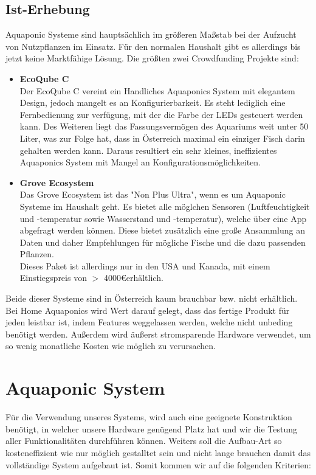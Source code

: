 \documentclass[11pt]{article}
\begin{document}
\subsection{Ist-Erhebung}
Aquaponic Systeme sind haupts\"achlich im gr\"o{\ss}eren Ma{\ss}stab bei der Aufzucht von Nutzpflanzen im Einsatz. F\"ur den normalen Haushalt gibt es allerdings bis jetzt keine Marktf\"ahige L\"osung. Die gr\"o{\ss}ten zwei Crowdfunding Projekte sind:
\begin{itemize}
	\item \textbf{EcoQube C}\\
		Der EcoQube C vereint ein Handliches Aquaponics System mit elegantem Design, jedoch mangelt es an Konfigurierbarkeit. Es steht lediglich eine Fernbedienung zur verf\"ugung, mit der die Farbe der LEDs gesteuert werden kann. Des Weiteren liegt das Fassungsverm\"ogen des Aquariums weit unter 50 Liter, was zur Folge hat, dass in \"Osterreich maximal ein einziger Fisch darin gehalten werden kann. Daraus resultiert ein sehr kleines, ineffizientes Aquaponics System mit Mangel an Konfigurationsm\"oglichkeiten. \\
	\item \textbf{Grove Ecosystem}\\
	Das Grove Ecosystem ist das "Non Plus Ultra", wenn es um Aquaponic Systeme im Haushalt geht. Es bietet alle m\"oglchen Sensoren (Luftfeuchtigkeit und -temperatur sowie Wasserstand und -temperatur), welche \"uber eine App abgefragt werden k\"onnen. Diese bietet zus\"atzlich eine gro{\ss}e Ansammlung an Daten und daher Empfehlungen f\"ur m\"ogliche Fische und die dazu passenden Pflanzen. \\
	Dieses Paket ist allerdings nur in den USA und Kanada, mit einem Einstiegspreis von $>$ 4000\euro\hspace{0.5em}erh\"altlich.
\end{itemize}
Beide dieser Systeme sind in \"Osterreich kaum brauchbar bzw. nicht erh\"altlich. Bei Home Aquaponics wird Wert darauf gelegt, dass das fertige Produkt f\"ur jeden leistbar ist, indem Features weggelassen werden, welche nicht unbeding ben\"otigt werden. Au{\ss}erdem wird \"au{\ss}erst stromsparende Hardware verwendet, um so wenig monatliche Kosten wie m\"oglich zu verursachen.
\newpage
\section{Aquaponic System}
F\"ur die Verwendung unseres Systems, wird auch eine geeignete Konstruktion 
ben\"otigt, in welcher unsere Hardware gen\"ugend Platz hat und wir die Testung aller Funktionalit\"aten durchf\"uhren k\"onnen. Weiters soll die Aufbau-Art so kosteneffizient wie nur m\"oglich gestalltet sein und nicht lange brauchen damit das vollst\"andige System aufgebaut ist.
Somit kommen wir auf die folgenden Kriterien:
\end{document}

